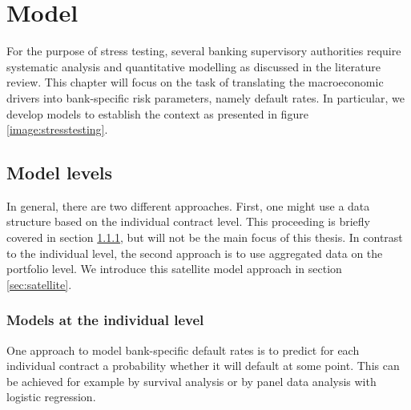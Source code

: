 \documentclass[a4paper, 11pt]{scrreprt}
\begin{document}
\chapter{Model}\label{par:model}

For the purpose of stress testing, several banking supervisory authorities require systematic analysis and quantitative modelling as discussed in the literature review. 
This chapter will focus on the task of translating the macroeconomic drivers into bank-specific risk parameters, namely default rates. In particular, we develop models to establish the context as presented in figure \ref{image:stresstesting}.

\section{Model levels}
In general, there are two different approaches. First, one might use a data structure based on the individual contract level. This proceeding is briefly covered in section \ref{sec:individual}, but will not be the main focus of this thesis. In contrast to the individual level, the second approach is to use aggregated data on the portfolio level. We introduce this satellite model approach in section \ref{sec:satellite}.


\subsection{Models at the individual level}\label{sec:individual}

One approach to model bank-specific default rates is to predict for each individual contract a probability whether it will default at some point. 
This can be achieved for example by survival analysis or by panel data analysis with logistic regression. 

\bigskip 
\end{document}

